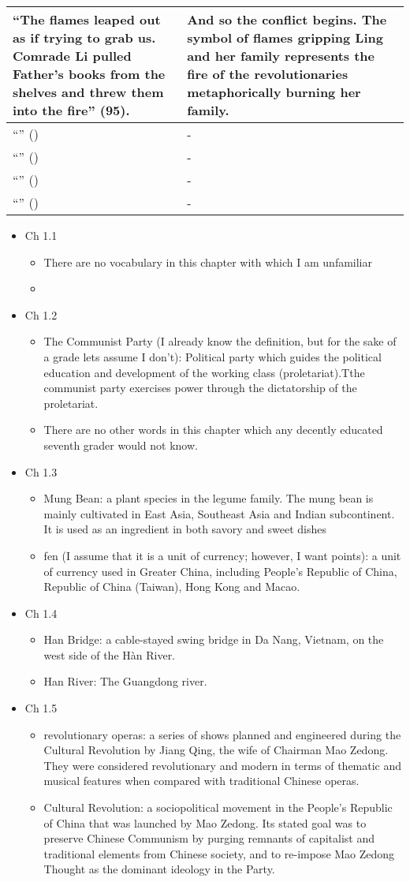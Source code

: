 \documentclass[12pt]{article}
\newcommand{\vc}[4]{
  \item Ch #1.#2
  \begin{itemize}
    \item #3
    \item #4
  \end{itemize}
}
\begin{document}
\begin{tabularx}{\textwidth}{ |X|X| }
  \hline
  ``The flames leaped out as if trying to grab us. Comrade Li pulled Father's books from the shelves and threw them into the fire'' (95). & And so the conflict begins. The symbol of flames gripping Ling and her family represents the fire of the revolutionaries metaphorically burning her family. \\
  \hline
  ``'' () & - \\
  \hline
  ``'' () & - \\
  \hline
  ``'' () & - \\
  \hline
  ``'' () & - \\
  \hline


\end{tabularx}
\vspace{2em}
\begin{itemize}

  \vc{1}{1}{There are no vocabulary in this chapter with which I am unfamiliar}{}

  \vc{1}{2}{The Communist Party (I already know the definition, but for the sake of a grade lets assume I don't): Political party which guides the political education and development of the working class (proletariat).Tthe communist party exercises power through the dictatorship of the proletariat.}{There are no other words in this chapter which any decently educated seventh grader would not know.}

  \vc{1}{3}{Mung Bean: a plant species in the legume family. The mung bean is mainly cultivated in East Asia, Southeast Asia and Indian subcontinent. It is used as an ingredient in both savory and sweet dishes}{fen (I assume that it is a unit of currency; however, I want points): a unit of currency used in Greater China, including People's Republic of China, Republic of China (Taiwan), Hong Kong and Macao.}

  \vc{1}{4}{Han Bridge: a cable-stayed swing bridge in Da Nang, Vietnam, on the west side of the Hàn River.}{Han River: The Guangdong river.}

  \vc{1}{5}{revolutionary operas: a series of shows planned and engineered during the Cultural Revolution by Jiang Qing, the wife of Chairman Mao Zedong. They were considered revolutionary and modern in terms of thematic and musical features when compared with traditional Chinese operas.}{Cultural Revolution: a sociopolitical movement in the People's Republic of China that was launched by Mao Zedong. Its stated goal was to preserve Chinese Communism by purging remnants of capitalist and traditional elements from Chinese society, and to re-impose Mao Zedong Thought as the dominant ideology in the Party.}


\end{itemize}
\end{document}

